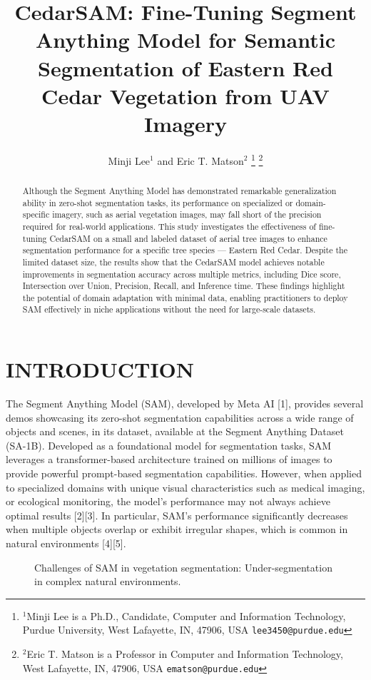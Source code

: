 \documentclass[letterpaper, 10 pt, conference]{ieeeconf}  %
\title{\LARGE \bf
CedarSAM: Fine-Tuning Segment Anything Model for Semantic Segmentation of Eastern Red Cedar Vegetation from UAV Imagery
}
\author{Minji Lee$^{1}$ and Eric T. Matson$^{2}$%
\thanks{$^{1}$Minji Lee is a Ph.D., Candidate, Computer and Information Technology, Purdue University, West Lafayette, IN, 47906, USA
        {\tt\small lee3450@purdue.edu}}%
\thanks{$^{2}$Eric T. Matson is a Professor in Computer and Information Technology, West Lafayette, IN, 47906, USA
        {\tt\small ematson@purdue.edu}}%
}
\begin{document}
\maketitle
\thispagestyle{empty}
\pagestyle{empty}


\begin{abstract}
Although the Segment Anything Model has demonstrated remarkable generalization ability in zero-shot segmentation tasks, its performance on specialized or domain-specific imagery, such as aerial vegetation images, may fall short of the precision required for real-world applications. This study investigates the effectiveness of fine-tuning CedarSAM on a small and labeled dataset of aerial tree images to enhance segmentation performance for a specific tree species — Eastern Red Cedar. Despite the limited dataset size, the results show that the CedarSAM model achieves notable improvements in segmentation accuracy across multiple metrics, including Dice score, Intersection over Union, Precision, Recall, and Inference time. These findings highlight the potential of domain adaptation with minimal data, enabling practitioners to deploy SAM effectively in niche applications without the need for large-scale datasets.
\end{abstract}

\section{INTRODUCTION}
The Segment Anything Model (SAM), developed by Meta AI [1], provides several demos showcasing its zero-shot segmentation capabilities across a wide range of objects and scenes, in its dataset, available at the Segment Anything Dataset (SA-1B). Developed as a foundational model for segmentation tasks, SAM leverages a transformer-based architecture trained on millions of images to provide powerful prompt-based segmentation capabilities. However, when applied to specialized domains with unique visual characteristics such as medical imaging, or ecological monitoring, the model's performance may not always achieve optimal results [2][3]. In particular, SAM’s performance significantly decreases when multiple objects overlap or exhibit irregular shapes, which is common in natural environments [4][5].

\begin{figure}[thpb]
  \centering
  \caption{Challenges of SAM in vegetation segmentation: Under-segmentation in complex natural environments.}
  \label{fig:score_distributions}
\end{figure}
\end{document}
